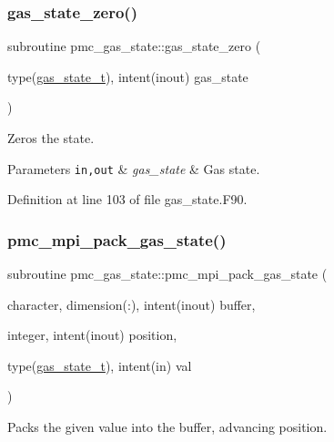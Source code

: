 \subsubsection{\texorpdfstring{gas\+\_\+state\+\_\+zero()}{gas\_state\_zero()}}
{\footnotesize\ttfamily subroutine pmc\+\_\+gas\+\_\+state\+::gas\+\_\+state\+\_\+zero (\begin{DoxyParamCaption}\item[{type(\mbox{\hyperlink{structpmc__gas__state_1_1gas__state__t}{gas\+\_\+state\+\_\+t}}), intent(inout)}]{gas\+\_\+state }\end{DoxyParamCaption})}



Zeros the state. 


\begin{DoxyParams}[1]{Parameters}
\mbox{\tt in,out}  & {\em gas\+\_\+state} & Gas state. \\
\hline
\end{DoxyParams}


Definition at line 103 of file gas\+\_\+state.\+F90.

\mbox{\label{namespacepmc__gas__state_a4bb38e6e0dabd7944df3a2ce21020b92}} 
\subsubsection{\texorpdfstring{pmc\+\_\+mpi\+\_\+pack\+\_\+gas\+\_\+state()}{pmc\_mpi\_pack\_gas\_state()}}
{\footnotesize\ttfamily subroutine pmc\+\_\+gas\+\_\+state\+::pmc\+\_\+mpi\+\_\+pack\+\_\+gas\+\_\+state (\begin{DoxyParamCaption}\item[{character, dimension(\+:), intent(inout)}]{buffer,  }\item[{integer, intent(inout)}]{position,  }\item[{type(\mbox{\hyperlink{structpmc__gas__state_1_1gas__state__t}{gas\+\_\+state\+\_\+t}}), intent(in)}]{val }\end{DoxyParamCaption})}



Packs the given value into the buffer, advancing position. 


